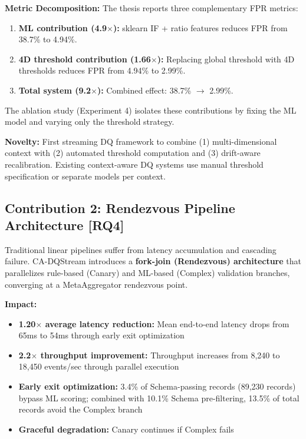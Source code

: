 \textbf{Metric Decomposition:} The thesis reports three complementary FPR metrics:
\begin{enumerate}
    \item \textbf{ML contribution (4.9$\times$):} sklearn IF + ratio features reduces FPR from 38.7\% to 4.94\%.
    \item \textbf{4D threshold contribution (1.66$\times$):} Replacing global threshold with 4D thresholds reduces FPR from 4.94\% to 2.99\%.
    \item \textbf{Total system (9.2$\times$):} Combined effect: 38.7\% $\to$ 2.99\%.
\end{enumerate}
The ablation study (Experiment 4) isolates these contributions by fixing the ML model and varying only the threshold strategy.

\textbf{Novelty:} First streaming DQ framework to combine (1) multi-dimensional context with (2) automated threshold computation and (3) drift-aware recalibration. Existing context-aware DQ systems use manual threshold specification or separate models per context.

\subsection{Contribution 2: Rendezvous Pipeline Architecture [RQ4]}

Traditional linear pipelines suffer from latency accumulation and cascading failure. CA-DQStream introduces a \textbf{fork-join (Rendezvous) architecture} that parallelizes rule-based (Canary) and ML-based (Complex) validation branches, converging at a MetaAggregator rendezvous point.

\textbf{Impact:}
\begin{itemize}
    \item \textbf{1.20$\times$ average latency reduction:} Mean end-to-end latency drops from 65ms to 54ms through early exit optimization
    \item \textbf{2.2$\times$ throughput improvement:} Throughput increases from 8,240 to 18,450 events/sec through parallel execution
    \item \textbf{Early exit optimization:} 3.4\% of Schema-passing records (89,230 records) bypass ML scoring; combined with 10.1\% Schema pre-filtering, 13.5\% of total records avoid the Complex branch
    \item \textbf{Graceful degradation:} Canary continues if Complex fails
\end{itemize}

